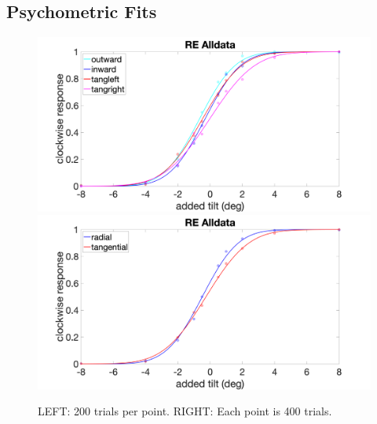 \documentclass[11pt]{article} %
\begin{document}
\subsection{Psychometric Fits}
\begin{figure}[H]
\centering %
\includegraphics[scale=.16]{Images/RE_PF_Alldata_4conds.png}
\includegraphics[scale=.16]{Images/RE_PF_Alldata_2conds.png}
\caption{LEFT: 200 trials per point. RIGHT: Each point is 400 trials.}
\end{figure}
\end{document}
